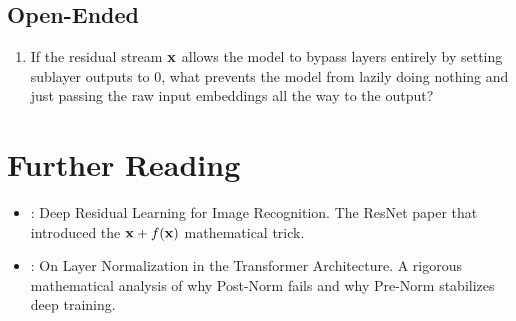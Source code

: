 \subsection*{Open-Ended}
\begin{enumerate}
  \item If the residual stream $\mathbf{x}$ allows the model to bypass layers entirely by setting sublayer outputs to 0, what prevents the model from lazily doing nothing and just passing the raw input embeddings all the way to the output?
\end{enumerate}

\section{Further Reading}
\label{ch:10:sec:further}

\begin{itemize}
  \item \textcite{he2016}: Deep Residual Learning for Image Recognition. The ResNet paper that introduced the $\mathbf{x} + f(\mathbf{x})$ mathematical trick.
  \item \textcite{xiong2020}: On Layer Normalization in the Transformer Architecture. A rigorous mathematical analysis of why Post-Norm fails and why Pre-Norm stabilizes deep training.
\end{itemize}
